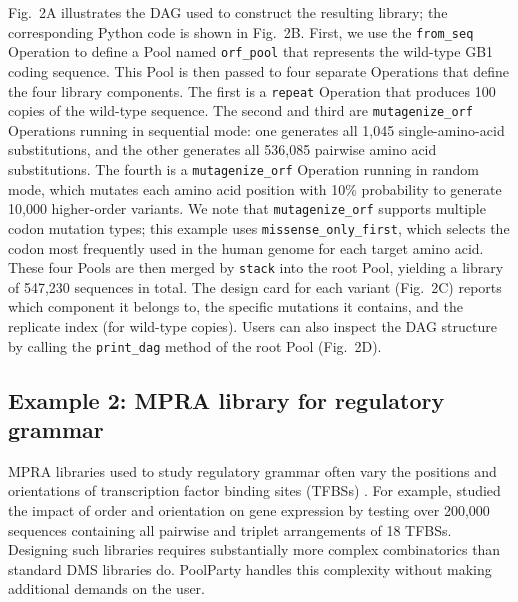 \documentclass[pdflatex,sn-vancouver-num,referee,oneside]{sn-jnl}
\newif\ifshowquoted
\newcommand{\quoted}[1]{\ifshowquoted\textcolor{quotedtext}{#1}\else#1\fi}
\begin{document}
Fig.~2A illustrates the DAG used to construct the resulting library; the corresponding Python code is shown in Fig.~2B. First, we use the \texttt{from\_seq} Operation to define a Pool named \texttt{orf\_pool} that represents the wild-type GB1 coding sequence. This Pool is then passed to four separate Operations that define the four library components. The first is a \texttt{repeat} Operation that produces 100 copies of the wild-type sequence. The second and third are \texttt{mutagenize\_orf} Operations running in sequential mode: one generates all 1,045 single-amino-acid substitutions, and the other generates all 536,085 pairwise amino acid substitutions. The fourth is a \texttt{mutagenize\_orf} Operation running in random mode, which mutates each amino acid position with 10\% probability to generate 10,000 higher-order variants. \quoted{We note that \texttt{mutagenize\_orf} supports multiple codon mutation types; this example uses \texttt{missense\_only\_first}, which selects the codon most frequently used in the human genome for each target amino acid.} These four Pools are then merged by \texttt{stack} into the root Pool, yielding a library of 547,230 sequences in total. The design card for each variant (Fig.~2C) reports which component it belongs to, the specific mutations it contains, and the replicate index (for wild-type copies). Users can also inspect the DAG structure by calling the \texttt{print\_dag} method of the root Pool (Fig.~2D).

\subsection*{Example 2: MPRA library for regulatory grammar}\label{subsec:example2-mpra}

MPRA libraries used to study regulatory grammar often vary the positions and orientations of transcription factor binding sites (TFBSs) \citep{Melnikov2012dw, Sharon2012io, King2020aa, Smith2013kn, Grossman2017aa, WeingartenGabbay2019bl, GeorgakopoulosSoares2023tf}. For example, \citet{GeorgakopoulosSoares2023tf} studied the impact of order and orientation on gene expression by testing over 200,000 sequences containing all pairwise and triplet arrangements of 18 TFBSs. Designing such libraries requires substantially more complex combinatorics than standard DMS libraries do. PoolParty handles this complexity without making additional demands on the user.
\end{document}
